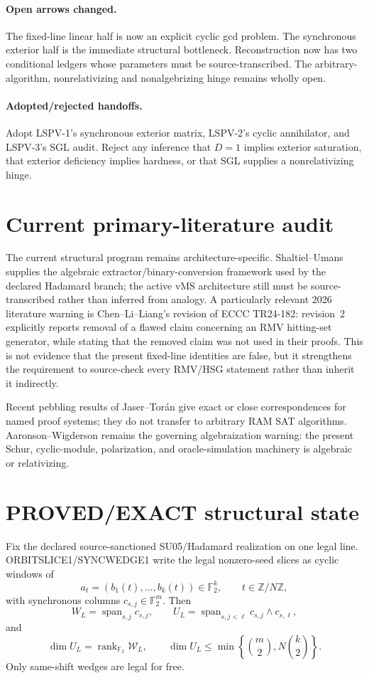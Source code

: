 \documentclass[11pt]{article}
\begin{document}
\paragraph{Open arrows changed.}
The fixed-line linear half is now an explicit cyclic gcd problem. The synchronous exterior half is the immediate structural bottleneck. Reconstruction now has two conditional ledgers whose parameters must be source-transcribed. The arbitrary-algorithm, nonrelativizing and nonalgebrizing hinge remains wholly open.

\paragraph{Adopted/rejected handoffs.}
Adopt LSPV-1's synchronous exterior matrix, LSPV-2's cyclic annihilator, and LSPV-3's SGL audit. Reject any inference that \(D=1\) implies exterior saturation, that exterior deficiency implies hardness, or that SGL supplies a nonrelativizing hinge.

\section*{Current primary-literature audit}
The current structural program remains architecture-specific. Shaltiel--Umans supplies the algebraic extractor/binary-conversion framework used by the declared Hadamard branch; the active vMS architecture still must be source-transcribed rather than inferred from analogy. A particularly relevant 2026 literature warning is Chen--Li--Liang's revision of ECCC TR24-182: revision~2 explicitly reports removal of a flawed claim concerning an RMV hitting-set generator, while stating that the removed claim was not used in their proofs. This is not evidence that the present fixed-line identities are false, but it strengthens the requirement to source-check every RMV/HSG statement rather than inherit it indirectly.

Recent pebbling results of Jaser--Tor\'an give exact or close correspondences for named proof systems; they do not transfer to arbitrary RAM SAT algorithms. Aaronson--Wigderson remains the governing algebraization warning: the present Schur, cyclic-module, polarization, and oracle-simulation machinery is algebraic or relativizing.

\section*{PROVED/EXACT structural state}
Fix the declared source-sanctioned SU05/Hadamard realization on one legal line. ORBITSLICE1/SYNCWEDGE1 write the legal nonzero-seed slices as cyclic windows of
\[
a_t=(b_1(t),\ldots,b_k(t))\in\mathbb F_2^k,\qquad t\in\mathbb Z/N\mathbb Z,
\]
with synchronous columns \(c_{s,j}\in\mathbb F_2^m\). Then
\[
W_L=\operatorname{span}_{s,j}c_{s,j},\qquad
U_L=\operatorname{span}_{s,j<\ell}c_{s,j}\wedge c_{s,\ell},
\]
and
\[
\dim U_L=\operatorname{rank}_{\mathbb F_2}\mathcal W_L,\qquad
\dim U_L\le\min\left\{\binom m2,N\binom k2\right\}.
\]
Only same-shift wedges are legal for free.
\end{document}

